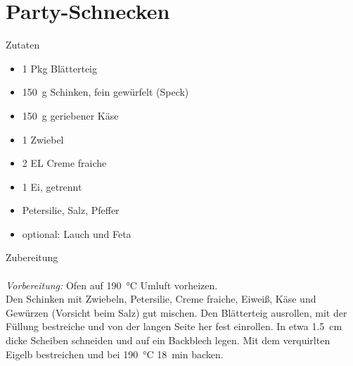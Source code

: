 \section*{Party-Schnecken}
\ihead{}\ohead{}
\cfoot{}
{\Large Zutaten}
\begin{multicols}{2}
\begin{itemize}
    \item \num{1} Pkg Blätterteig
    \item \SI{150}{g} Schinken, fein gewürfelt (Speck)
    \item \SI{150}{g} geriebener Käse
    \item \num{1} Zwiebel
    \item \num{2} EL Creme fraiche
    \item \num{1} Ei, getrennt
    \item Petersilie, Salz, Pfeffer
    \item optional: Lauch und Feta
\end{itemize}
\end{multicols}
\noindent
{\Large Zubereitung}\\
\\
\textit{Vorbereitung:} Ofen auf \SI{190}{\celsius} Umluft vorheizen.\\
Den Schinken mit Zwiebeln, Petersilie, Creme fraiche, Eiweiß, Käse und Gewürzen (Vorsicht beim Salz) gut mischen. 
Den Blätterteig ausrollen, mit der Füllung bestreiche und von der langen Seite her fest einrollen.
In etwa \SI{1.5}{cm} dicke Scheiben schneiden und auf ein Backblech legen. 
Mit dem verquirlten Eigelb bestreichen und bei \SI{190}{\celsius} \SI{18}{min} backen.